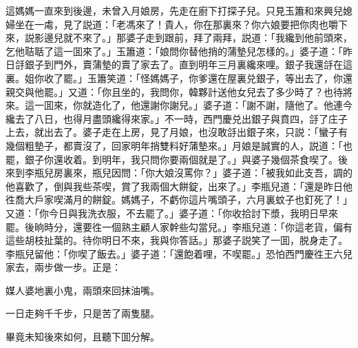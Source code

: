 這媽媽一直來到後邊，未曾入月娘房，先走在廚下打探子兒。只見玉簫和來興兒媳婦坐在一䖏，見了説道：「老馮來了！貴人，你在那裏來？你六娘要把你肉也嚼下來，説影邊兒就不來了。」那婆子走到跟前，拜了兩拜，説道：「我纔到他前頭來，乞他聐聒了這一囬來了。」玉簫道：「娘問你替他捎的蒲墊兒怎樣的。」婆子道：「昨日㧱銀子到門外，賣蒲墊的賣了家去了。直到明年三月裏纔來哩。銀子我還㧱在這裏。姐你收了罷。」玉簫笑道：「怪媽媽子，你爹還在屋裏兑銀子，等出去了，你還親交與他罷。」又道：「你且坐的，我問你，韓夥計送他女兒去了多少時了？也待將來。這一囬來，你就造化了，他還謝你謝兒。」婆子道：「謝不謝，隨他了。他連今纔去了八日，也得月盡頭纔得來家。」不一時，西門慶兑出銀子與賁四，㧱了庄子上去，就出去了。婆子走在上房，見了月娘，也沒敢㧱出銀子來，只説：「蠻子有幾個粗墊子，都賣沒了，回家明年捎雙料好蒲墊來。」月娘是誠實的人，説道：「也罷，銀子你還收着。到明年，我只問你要兩個就是了。」與婆子幾個茶食喫了。後來到李瓶兒房裏來，瓶兒因問：「你大娘沒罵你？」婆子道：「被我如此支吾，調的他喜歡了，倒與我些茶喫，賞了我兩個大餅錠，出來了。」李瓶兒道：「還是昨日他徃喬大戶家喫滿月的餅錠。媽媽子，不虧你這片嘴頭子，六月裏蚊子也釘死了！」又道：「你今日與我洗衣服，不去罷了。」婆子道：「你收拾討下漿，我明日早來罷。後晌時分，還要徃一個熟主顧人家幹些勾當兒。」李瓶兒道：「你這老貨，偏有這些胡枝扯葉的。待你明日不來，我與你答話。」那婆子説笑了一囬，脱身走了。李瓶兒留他：「你喫了飯去。」婆子道：「還飽着哩，不喫罷。」恐怕西門慶徃王六兒家去，兩步做一步。正是：

\begin{myquote}
媒人婆地裏小鬼，兩頭來回抹油嘴。

一日走夠千千步，只是苦了兩隻腿。
\end{myquote}

畢竟未知後來如何，且聽下囬分解。

